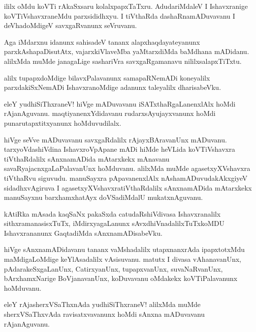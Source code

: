 \documentclass{article}
\begin{document}
\begin{mn}
ililx oMdu koVTi rAkaSxsaru kolalxpapxTaTxru. AdudariMdaleV I Ishavxranige koVTiVshavxraneMdu 
parxsididhxyu. I tiVthaRda dashaRnamADuvavanu I deVhadoMdigeV savxgaRvanunx seVruvanu.
\end{mn}

\begin{mn}
Aga iMdarxnu idanunx sahisadeV tananx alapxhaqdayateyanunx parxkAshapaDisutAtx, vajarxkiVlaveMba
yaMtarxdiMda baMdhana mADidanu. alilxMda muMde janagaLige sashariVra savxgaRgamanavu 
nililxsalapxTiTxtu.
\end{mn}

\begin{mn}
alilx tupapxdoMdige bilavxPalavanunx samapaRNemADi koneyalilx parxdakiSxNemADi IshavxranoMdige 
adanunx taleyalilx dharisabeVku.
\end{mn}

\begin{mn}
eleY yudhiSiThxraneV! hiVge mADuvavanu iSATxthaRgaLanenxlAlx hoMdi rAjanAguvanu. 
maqtiyanenxYdidavanu  rudarxsAyujayxvanunx hoMdi punarutapxtitxyanunx hoMduvudilalx.
\end{mn}

\begin{mn}
hiVge seVve mADuvavanu savxgaRdalilx rAjayxBAravanUnx mADuvanu. tarxyoVdashiVdina IshavxroVpApane 
mADi hiMde heVLida koVTiVshavxra tiVthaRdalilx sAnxnamADida mAtarxkekx mAnavanu 
savaRyajacnxgaLaPalavanUnx hoMduvanu. alilxMda muMde agasetxyXVshavxra tiVthaRvu siguvudu.
manuSayxra pApavanenxlAlx nAshamADuvudakAkxgiyeV sidadhxvAgiruva I agasetxyXVshavxratiVthaRdalilx 
sAnxnamADida mAtarxkekx manuSayxnu barxhamxhatAyx doVSadiMdalU mukatxnAguvanu.
\end{mn}

\begin{mn}
kAtiRka mAsada kaqSaNx pakaSxda catudaRshiVdivasa Ishavxranalilx sithxramanasisxTuTx, 
iMdirxyagaLanunx sAvxdhiVnadalilxTuTxkoMDU Ishavxrananunx  GaqtadiMda sAnxnamADisabeVku.
\end{mn}


\begin{mn}
hiVge sAnxnamADidavanu tananx vaMshadalilx utapxnanxrAda ipapxtotxMdu maMdigaLoMdige 
keYlAsadalilx vAsisuvanu. matutx I divasa vAhanavanUnx, pAdarakeSxgaLanUnx, CatirxyanUnx,
tupapxvanUnx, suvaNaRvanUnx, bArxhamxNarige BoVjanavanUnx, koDuvavanu oMdakekx koVTiPalavanunx 
hoMduvanu.
\end{mn}

\begin{mn}
eleY rAjasherxVSaThxnAda yudhiSiThxraneV! alilxMda muMde sherxVSaThxvAda ravisatxvavanunx hoMdi 
sAnxna mADuvavanu rAjanAguvanu.
\end{mn}
\end{document}
